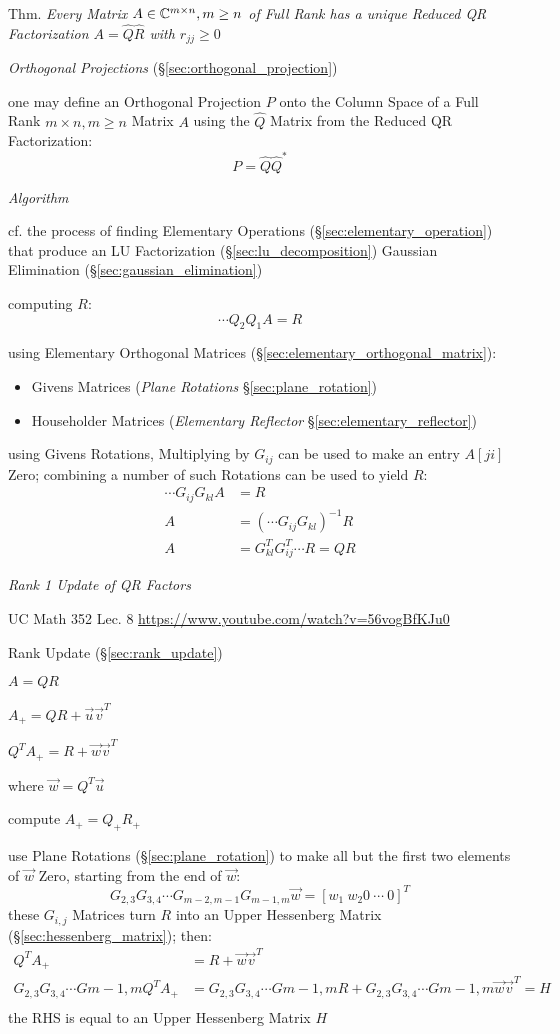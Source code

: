 Thm. \emph{Every Matrix $A \in \mathbb{C}^{m \times n}, m \geq n$ of Full Rank has
  a unique Reduced QR Factorization $A = \hat{Q}\hat{R}$ with $r_{jj} \geq 0$}


\emph{Orthogonal Projections} (\S\ref{sec:orthogonal_projection})

one may define an Orthogonal Projection $P$ onto the Column Space of a Full Rank
$m \times n, m \geq n$ Matrix $A$ using the $\hat{Q}$ Matrix from the Reduced
QR Factorization:
\[
  P = \hat{Q}\hat{Q}^*
\]


\emph{Algorithm}

cf. the process of finding Elementary Operations
(\S\ref{sec:elementary_operation}) that produce an LU Factorization
(\S\ref{sec:lu_decomposition}) \fist Gaussian Elimination
(\S\ref{sec:gaussian_elimination})

computing $R$:
\[
  \cdots Q_2 Q_1 A = R
\]

using Elementary Orthogonal Matrices (\S\ref{sec:elementary_orthogonal_matrix}):
\begin{itemize}
  \item Givens Matrices (\emph{Plane Rotations} \S\ref{sec:plane_rotation})
  \item Householder Matrices (\emph{Elementary Reflector}
    \S\ref{sec:elementary_reflector})
\end{itemize}

using Givens Rotations, Multiplying by $G_{ij}$ can be used to make an entry
$A[ji]$ Zero; combining a number of such Rotations can be used to yield $R$:
\begin{align*}
  \cdots G_{ij}G_{kl}A & = R \\
  A & = (\cdots G_{ij}G_{kl})^{-1}R \\
  A & = G_{kl}^T G_{ij}^T \cdots R = QR
\end{align*}


\emph{Rank 1 Update of QR Factors}

UC Math 352 Lec. 8 \url{https://www.youtube.com/watch?v=56vogBfKJu0}

Rank Update (\S\ref{sec:rank_update})

$A = QR$

$A_+ = QR + \vec{u}\vec{v}^T$

$Q^T A_+ = R + \vec{w}\vec{v}^T$

where $\vec{w} = Q^T\vec{u}$

compute $A_+ = Q_+ R_+$

use Plane Rotations (\S\ref{sec:plane_rotation}) to make all but the first two
elements of $\vec{w}$ Zero, starting from the end of $\vec{w}$:
\[
  G_{2,3}G_{3,4}\cdots G_{m-2,m-1}G_{m-1,m} \vec{w} = [w_1 \ w_2 0 \ \cdots \ 0]^T
\]
these $G_{i,j}$ Matrices turn $R$ into an Upper Hessenberg Matrix
(\S\ref{sec:hessenberg_matrix}); then:
\begin{align*}
  Q^T A_+ & = R + \vec{w}\vec{v}^T \\
  G_{2,3}G_{3,4}\cdots G{m-1,m} Q^T A_+ & =
    G_{2,3}G_{3,4}\cdots G{m-1,m} R +
    G_{2,3}G_{3,4}\cdots G{m-1,m} \vec{w}\vec{v}^T  = H\\
\end{align*}
the RHS is equal to an Upper Hessenberg Matrix $H$

